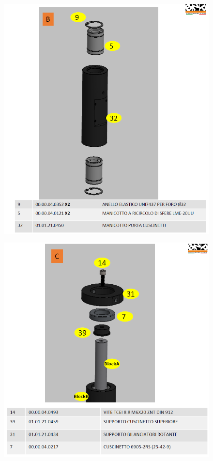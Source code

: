 \begin{figure} [h]
\centering
\includegraphics[width=1.0
\textwidth]{figures/Magistrale/ass_obj_2}
\caption[BFS Example]{
\label{fig:ass_obj_2}}
\end{figure} 

\begin{figure} [h]
\centering
\includegraphics[width=1.0
\textwidth]{figures/Magistrale/ass_obj_3}
\caption[BFS Example]{
\label{fig:ass_obj_3}}
\end{figure} 
